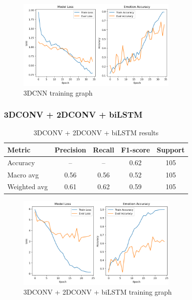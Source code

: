 \documentclass{article}
\begin{document}
\begin{figure}[H]
  \begin{center}
    \includegraphics*[width=0.7\textwidth]{Figures/Picture9.png}
  \end{center}
  \caption{3DCNN training graph}
  \label{fig:fig9}
\end{figure}

\subsubsection{3DCONV + 2DCONV + biLSTM}

\begin{table}[H]
\centering
\caption{3DCONV + 2DCONV + biLSTM results}
\begin{tabular}{|l|c|c|c|c|}
\hline
\textbf{Metric} & \textbf{Precision} & \textbf{Recall} & \textbf{F1-score} & \textbf{Support} \\
\hline
Accuracy       & --   & --   & 0.62 & 105 \\
Macro avg      & 0.56 & 0.56 & 0.52 & 105 \\
Weighted avg   & 0.61 & 0.62 & 0.59 & 105 \\
\hline
\end{tabular}%
\label{tab:table6}
\end{table}

\begin{figure}[H]
  \begin{center}
    \includegraphics*[width=0.7\textwidth]{Figures/Picture10.png}
  \end{center}
  \caption{3DCONV + 2DCONV + biLSTM training graph}
  \label{fig:fig10}
\end{figure}
\end{document}
